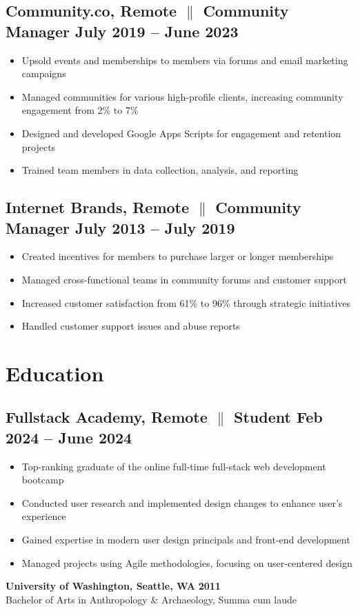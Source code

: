 \documentclass[a4paper,10pt]{article}
\begin{document}
\subsection{Community.co, Remote {$\parallel$}{ Community Manager} \hfill
      \textbf{July 2019 – June
            2023}}
\begin{itemize}
      \item Upsold events and memberships to members via forums and email marketing campaigns
      \item Managed communities for various high-profile clients, increasing
            community engagement from 2\% to 7\%
      \item Designed and developed Google Apps Scripts for engagement and retention
            projects
      \item Trained team members in data collection, analysis, and reporting
\end{itemize}

\subsection{Internet Brands, Remote {$\parallel$}{ Community Manager} \hfill
      \textbf{July 2013 – July
            2019}}
\begin{itemize}
      \item Created incentives for members to purchase larger or longer memberships
      \item Managed cross-functional teams in community forums and customer support
      \item Increased customer satisfaction from 61\% to 96\% through strategic
            initiatives
      \item Handled customer support issues and abuse reports
\end{itemize}

\section{Education}
\subsection{Fullstack Academy, Remote {$\parallel$}{ Student} \hfill
      \textbf{Feb
            2024 – June
            2024}}
\begin{itemize}
      \item Top-ranking graduate of the online full-time full-stack web
            development bootcamp
      \item Conducted user research and implemented design changes to enhance
            user's experience
      \item Gained expertise in modern user design principals and front-end
            development
      \item Managed projects using Agile methodologies, focusing on
            user-centered design
\end{itemize}
\textbf{University of Washington, Seattle, WA} \hfill
\textbf{2011}
\\
Bachelor of Arts in Anthropology \& Archaeology, Summa cum laude
\end{document}
